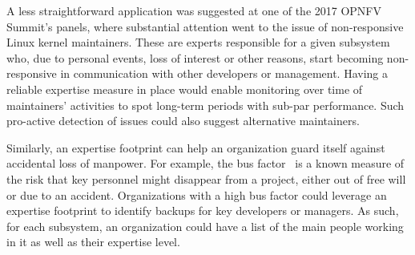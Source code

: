 A less straightforward application was suggested at one of the 2017 OPNFV Summit's panels, where substantial attention went to the issue of non-responsive Linux kernel maintainers. These are experts responsible for a given subsystem who, due to personal events, loss of interest or other reasons, start becoming non-responsive in communication with other developers or management. Having a reliable expertise measure in place would enable monitoring over time of maintainers' activities to spot long-term periods with sub-par performance. Such pro-active detection of issues could also suggest alternative maintainers.

Similarly, an expertise footprint can help an organization guard itself against accidental loss of manpower. For example, the bus factor~\citep{Mens2014} is a known measure of the risk that key personnel might disappear from a project, either out of free will or due to an accident. Organizations with a high bus factor could leverage an expertise footprint to identify backups for key developers or managers. As such, for each subsystem, an organization could have a list of the main people working in it as well as their expertise level.

